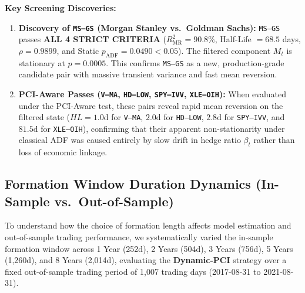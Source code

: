\documentclass[11pt, a4paper]{article}
\begin{document}
\noindent\textbf{Key Screening Discoveries:}
\begin{enumerate}
    \item \textbf{Discovery of \texttt{MS--GS} (Morgan Stanley vs.\ Goldman Sachs):} \texttt{MS--GS} passes \textbf{ALL 4 STRICT CRITERIA} ($R^2_{\text{MR}} = 90.8\%$, Half-Life $= 68.5$ days, $\rho = 0.9899$, and Static $p_{\text{ADF}} = 0.0490 < 0.05$). The filtered component $M_t$ is stationary at $p = 0.0005$. This confirms \texttt{MS--GS} as a new, production-grade candidate pair with massive transient variance and fast mean reversion.
    \item \textbf{PCI-Aware Passes (\texttt{V--MA}, \texttt{HD--LOW}, \texttt{SPY--IVV}, \texttt{XLE--OIH}):} When evaluated under the PCI-Aware test, these pairs reveal rapid mean reversion on the filtered state ($HL = 1.0\text{d}$ for \texttt{V--MA}, $2.0\text{d}$ for \texttt{HD--LOW}, $2.8\text{d}$ for \texttt{SPY--IVV}, and $81.5\text{d}$ for \texttt{XLE--OIH}), confirming that their apparent non-stationarity under classical ADF was caused entirely by slow drift in hedge ratio $\beta_t$ rather than loss of economic linkage.
\end{enumerate}

\subsection{Formation Window Duration Dynamics (In-Sample vs.\ Out-of-Sample)}
\label{sec:window_dynamics}

To understand how the choice of formation length affects model estimation and out-of-sample trading performance, we systematically varied the in-sample formation window across 1 Year (252d), 2 Years (504d), 3 Years (756d), 5 Years (1,260d), and 8 Years (2,014d), evaluating the \textbf{Dynamic-PCI} strategy over a fixed out-of-sample trading period of 1,007 trading days (2017-08-31 to 2021-08-31).
\end{document}
